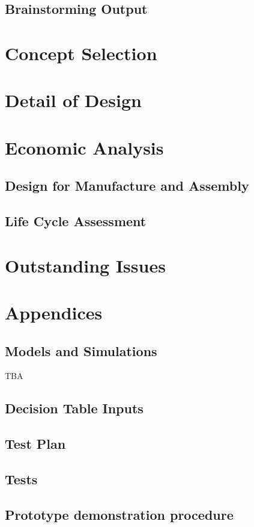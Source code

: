 \documentclass{article}
\begin{document}
\subsection{Brainstorming Output}


\section{Concept Selection}


\section{Detail of Design}





\section{Economic Analysis}
\subsection{Design for Manufacture and Assembly}

\subsection{Life Cycle Assessment}


\section{Outstanding Issues}


\appendix
\section{Appendices}
\subsection{Models and Simulations}
TBA
\subsection{Decision Table Inputs}
\subsection{Test Plan}

\subsection{Tests}

\subsection{Prototype demonstration procedure}

\end{document}
